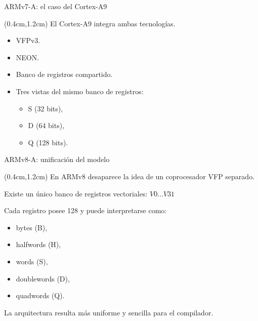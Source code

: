 
\begin{frame}{ARMv7-A: el caso del Cortex-A9}
 \begin{textblock*}{\textwidth}(0.4cm,1.2cm)\justifying
  El Cortex-A9 integra ambas tecnologías.
  \vspace{0.3cm}
  \begin{itemize}[<+->]
   \item VFPv3.
   \item NEON.
   \item Banco de registros compartido.
   \item Tres vistas del mismo banco de registros:
   \begin{itemize}[<+->]
    \item S (32 bits),
    \item D (64 bits),
    \item Q (128 bits).
   \end{itemize}
  \end{itemize}
  \vspace{0.5cm}
 \end{textblock*}
\end{frame}


\begin{frame}{ARMv8-A: unificación del modelo}
 \begin{textblock*}{\textwidth}(0.4cm,1.2cm)\justifying
  En ARMv8 desaparece la idea de un coprocesador VFP separado.
  \vspace{0.3cm}

  Existe un único banco de registros vectoriales:
  $ V0 \ldots V31$
  \vspace{0.3cm}

  Cada registro posee \SI{128}{\bit} y puede interpretarse como:
  \vspace{0.3cm}

  \begin{itemize}
   \item bytes (B),
   \item halfwords (H),
   \item words (S),
   \item doublewords (D),
   \item quadwords (Q).
  \end{itemize}
    \vspace{0.3cm}

  La arquitectura resulta más uniforme y sencilla para el compilador.
 \end{textblock*}
\end{frame}

